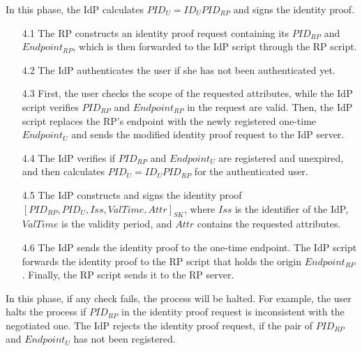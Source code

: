 In this phase, the IdP calculates $PID_U = {ID_U}{PID_{RP}}$ and signs the identity proof. %
\vspace{-\topsep}
\begin{itemize}
\item[4.1] The RP constructs an identity proof request containing its $PID_{RP}$ and $Endpoint_{RP}$, which is then forwarded to the IdP script through the RP script.
\vspace{-\topsep}
\item[4.2] The IdP authenticates the user if she has not been authenticated yet.
\vspace{-\topsep}
\item[4.3] First, the user checks the scope of the requested attributes, while the IdP script verifies $PID_{RP}$ and $Endpoint_{RP}$ in the request are valid. Then, the IdP script replaces the RP's endpoint with the newly registered one-time $Endpoint_U$ and sends the modified identity proof request to the IdP server.
\vspace{-\topsep}
\item [4.4] The IdP verifies if $PID_{RP}$ and $Endpoint_U$ are registered and unexpired, and then calculates $PID_U = {ID_U}{PID_{RP}}$ for the authenticated user.
\vspace{-\topsep}
\item[4.5] The IdP constructs and signs the identity proof $[PID_{RP}, PID_U, Iss, ValTime, Attr]_{SK}$, where $Iss$ is the identifier of the IdP, $ValTime$ is the validity period, and $Attr$ contains the requested attributes.
\vspace{-\topsep}
\item[4.6] The IdP sends the identity proof to the one-time endpoint. The IdP script forwards the identity proof to the RP script that holds the origin $Endpoint_{RP}$. Finally, the RP script sends it to the RP server.
\end{itemize}
\vspace{-\topsep}
In this phase, if any check fails, the process will be halted. For example, the user halts the process if $PID_{RP}$ in the identity proof request is inconsistent with  the negotiated one. The IdP rejects the identity proof request, if the pair of $PID_{RP}$ and $Endpoint_U$ has not been registered.



